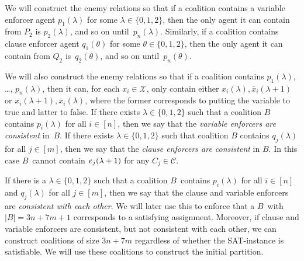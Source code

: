 \documentclass[a4paper,fleqn]{cas-sc}
\newcommand{\coalB}{\ensuremath{B}}
\newcommand{\ri}{\ensuremath{{\lambda}}}
\newcommand{\tvarN}[1]{\ensuremath{x_{#1}}}
\newcommand{\fvarN}[1]{\ensuremath{\bar{x}_{#1}}}
\newcommand{\pickN}[1]{\ensuremath{p_{#1}}}
\newcommand{\qickN}[1]{\ensuremath{q_{#1}}}
\newcommand{\tvar}[2]{\ensuremath{\tvarN{#1}(#2)}}
\newcommand{\fvar}[2]{\ensuremath{\fvarN{#1}(#2)}}
\newcommand{\claf}[2]{\ensuremath{\clafN{#1}(#2)}}
\newcommand{\picks}[1]{\ensuremath{P_{#1}}}
\newcommand{\qicks}[1]{\ensuremath{Q_{#1}}}
\newcommand{\pick}[2]{\ensuremath{\pickN{#1}(#2)}}
\newcommand{\qick}[2]{\ensuremath{\qickN{#1}(#2)}}
\newcommand{\ii}{\ensuremath{{i}}}
\newcommand{\cia}{\ensuremath{{j}}}
\newcommand{\ria}{\ensuremath{{\theta}}}
\newcommand{\myemph}[1]{{\color{green!25!black}\emph{#1}}}
\newcommand{\vars}{\mathcal{X}}
\newcommand{\clas}{\mathcal{C}}
\begin{document}
{We will construct the enemy relations so that if a coalition contains a variable enforcer agent $\pick 1 \ri$ for some $\ri \in \{0,1,2\}$, then the only agent it can contain from \picks{2} is \pick{2}{\ri}, and so on until~\pick{n}{\ri}.
Similarly, if a coalition contains clause enforcer agent $\qick 1 {\ria}$ for some $\ria \in \{0,1,2\}$, then the only agent it can contain from \qicks{2} is~\qick{2}{\ria}, and so on until~\pick{n}{\ria}.

We will also construct the enemy relations so that if a coalition contains \pick 1 \ri, \dots, \pick n \ri, then it can, for each $x_\ii \in \vars$, only contain either $\tvar \ii \ri, \fvar \ii {\ri + 1}$ or $\tvar \ii {\ri + 1},  \fvar \ii \ri$, where the former corresponds to putting the variable to true and latter to false. If there exists $\ri \in \{0,1,2\}$ such that a coalition $\coalB$ contains $\pick \ii \ri$ for all $\ii \in [n]$, then we say that the \myemph{variable enforcers are consistent} in~$\coalB$. 
If there exists $\ri \in \{0,1,2\}$ such that coalition $\coalB$ contains $\qick \cia \ri$ for all $\cia \in [m]$, then we say that the \myemph{clause enforcers are consistent} in $\coalB$. 
In this case \coalB\ cannot contain \claf \cia {\ri + 1} for any $C_\cia \in \clas$.


If there is a $\ri \in \{0,1,2\}$ such that a coalition \coalB\ contains  $\pick \ii \ri$ for all $\ii \in [n]$ and $\qick \cia \ri$ for all $\cia \in [m]$, then we say that the clause and variable enforcers are \myemph{consistent with each other}.
We will later use this to enforce that a \coalB\ with $|\coalB| = 3n + 7m + 1$ corresponds to a satisfying assignment.
Moreover, if clause and variable enforcers are consistent, but not consistent with each other, we can construct coalitions of size $3n + 7m$ regardless of whether the SAT-instance is satisfiable. We will use these coalitions to construct the initial partition.








}
\end{document}
